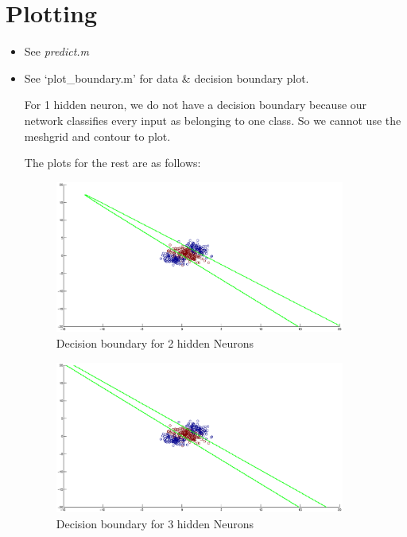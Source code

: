 \documentclass[a4paper]{article}
\begin{document}
\section*{Plotting}
	\begin{itemize}
		\item See \textit{predict.m}
		\item See `plot\_boundary.m' for data \& decision boundary plot. \newline
		
		For 1 hidden neuron, we do not have a decision boundary because our network classifies every input as belonging to one class. So we cannot use the meshgrid and contour to plot. \newline
		
		The plots for the rest are as follows:
		
			\begin{tcolorbox}
				\begin{figure}[H]
					\begin{center}
						\includegraphics[width=0.9\textwidth]{decisionboundary2.eps}
						\caption{ Decision boundary for 2 hidden Neurons }\label{fig:decisionbound-2}
					\end{center}
				\end{figure}
			\end{tcolorbox}
			
			\begin{tcolorbox}
				\begin{figure}[H]
					\begin{center}
						\includegraphics[width=0.9\textwidth]{decisionboundary3.eps}
						\caption{ Decision boundary for 3 hidden Neurons }\label{fig:decisionbound-3}
					\end{center}
				\end{figure}
			\end{tcolorbox}
			

\end{itemize}
\end{document}
